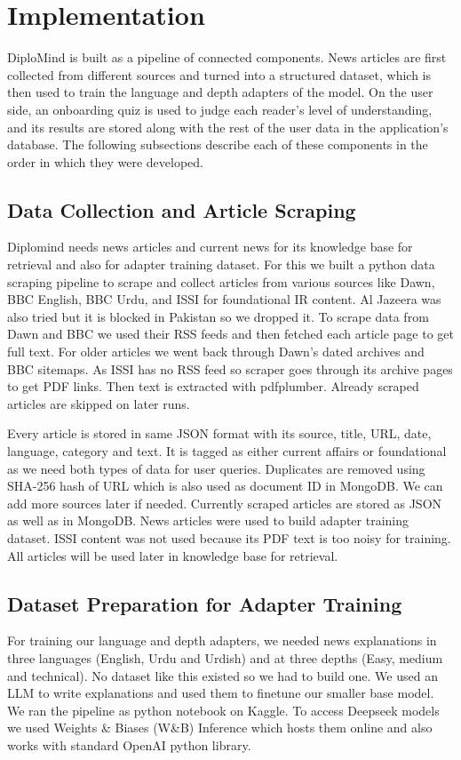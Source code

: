 \documentclass{FastFyp}
\begin{document}
\section{Implementation}
\label{sec:implementation}
DiploMind is built as a pipeline of connected components. News articles are first collected from different sources and turned into a structured dataset, which is then used to train the language and depth adapters of the model. On the user side, an onboarding quiz is used to judge each reader's level of understanding, and its results are stored along with the rest of the user data in the application's database. The following subsections describe each of these components in the order in which they were developed.

\subsection{Data Collection and Article Scraping}
Diplomind needs news articles and current news for its knowledge base for retrieval and also for adapter training dataset. For this we built a python data scraping pipeline to scrape and collect articles from various sources like Dawn, BBC English, BBC Urdu, and ISSI for foundational IR content. Al Jazeera was also tried but it is blocked in Pakistan so we dropped it. To scrape data from Dawn and BBC we used their RSS feeds and then fetched each article page to get full text. For older articles we went back through Dawn's dated archives and BBC sitemaps. As ISSI has no RSS feed so scraper goes through its archive pages to get PDF links. Then text is extracted with pdfplumber. Already scraped articles are skipped on later runs.

Every article is stored in same JSON format with its source, title, URL, date, language, category and text. It is tagged as either current affairs or foundational as we need both types of data for user queries. Duplicates are removed using SHA-256 hash of URL which is also used as document ID in MongoDB. We can add more sources later if needed. Currently scraped articles are stored as JSON as well as in MongoDB. News articles were used to build adapter training dataset. ISSI content was not used because its PDF text is too noisy for training. All articles will be used later in knowledge base for retrieval.


\subsection{Dataset Preparation for Adapter Training}
\label{subsec:impl-dataset}
For training our language and depth adapters, we needed news explanations in three languages (English, Urdu and Urdish) and at three depths (Easy, medium and technical). No dataset like this existed so we had to build one. We used an LLM to write explanations and used them to finetune our smaller base model.  We ran the pipeline as python notebook on Kaggle. To access Deepseek models we used Weights \& Biases (W\&B) Inference which hosts them online and also works with standard OpenAI python library.
\end{document}
